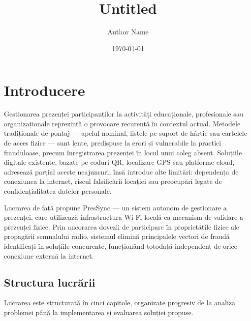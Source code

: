 \documentclass[11pt]{article}
\title{Untitled}
\author{Author Name}
\date{\today}
\begin{document}
\maketitle

\section{Introducere}

Gestionarea prezenței participanților la activități educaționale, profesionale sau organizaționale reprezintă o provocare recurentă în contextul actual. Metodele tradiționale de pontaj — apelul nominal, listele pe suport de hârtie sau cartelele de acces fizice — sunt lente, predispuse la erori și vulnerabile la practici frauduloase, precum înregistrarea prezenței în locul unui coleg absent. Soluțiile digitale existente, bazate pe coduri QR, localizare GPS sau platforme cloud, adresează parțial aceste neajunsuri, însă introduc alte limitări: dependența de conexiunea la internet, riscul falsificării locației sau preocupări legate de confidențialitatea datelor personale.

Lucrarea de față propune PresSync — un sistem autonom de gestionare a prezenței, care utilizează infrastructura Wi-Fi locală ca mecanism de validare a prezenței fizice. Prin ancorarea dovezii de participare în proprietățile fizice ale propagării semnalului radio, sistemul elimină principalele vectori de fraudă identificați în soluțiile concurente, funcționând totodată independent de orice conexiune externă la internet.

\subsection{Structura lucrării}

Lucrarea este structurată în cinci capitole, organizate progresiv de la analiza problemei până la implementarea și evaluarea soluției propuse.
\end{document}
